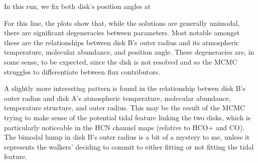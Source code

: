 In this run, we fix both disk's position angles at %

For this line, the plots show that, while the solutions are generally unimodal, there are significant degeneracies between parameters. Most notable amongst these are the relationships between disk B's outer radius and its atmospheric temperature, molecular abundance, and position angle. These degeneracies are, in some sense, to be expected, since the disk is not resolved and so the MCMC struggles to differentiate between flux contributors.

A slightly more interesting pattern is found in the relationship betwen disk B's outer radius and disk A's atmospheric temperature, molecular abundance, temperature structure, and outer radius. This may be the result of the MCMC trying to make sense of the potential tidal feature linking the two disks, which is particularly noticeable in the HCN channel maps (relative to HCO+ and CO). The bimodal hump in disk B's outer radius is a bit of a mystery to me, unless it represents the walkers' deciding to commit to either fitting or not fitting the tidal feature.



